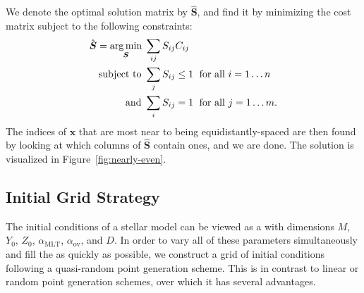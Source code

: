 We denote the optimal solution matrix by $\hat{\boldsymbol{S}}$, and find it by minimizing the cost matrix subject to the following constraints:
\begin{align}
  \hat{\boldsymbol{S}} = \underset{\boldsymbol S}{\arg\min} \; & \sum_{ij} S_{ij} C_{ij} \notag\\
  \text{subject to } & \sum_j S_{ij} \leq 1 \; \text{ for all } i=1\ldots n \notag\\
  \text{and } & \sum_i S_{ij} = 1 \; \text{ for all } j=1\ldots m.
  \label{eq:optimal-spacing}
\end{align}
The indices of $\mathbf x$ that are most near to being equidistantly-spaced are then found by looking at which columns of $\hat{\boldsymbol S}$ contain ones, and we are done. The solution is visualized in Figure~\ref{fig:nearly-even}.



\subsection{Initial Grid Strategy}
\label{sec:grid}
The initial conditions of a stellar model can be viewed as a  with dimensions $M$, $Y_0$, $Z_0$, $\alpha_{\text{MLT}}$, $\alpha_{\text{ov}}$, and $D$. In order to vary all of these parameters simultaneously and fill the  as quickly as possible, we construct a grid of initial conditions following a quasi-random point generation scheme. This is in contrast to linear or random point generation schemes, over which it has several advantages. 

